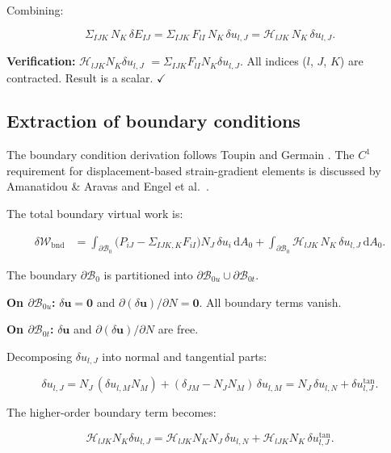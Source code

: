 \documentclass[11pt]{article}
\newcommand{\bu}{\mathbf{u}}
\newcommand{\bu}{\mathbf{u}}
\begin{document}
Combining:

\begin{equation}
\Sigma_{IJK}\,N_{K}\,\delta E_{IJ}
= \Sigma_{IJK}\,F_{lI}\,N_{K}\,\delta u_{l,J}
= \mathcal{H}_{lJK}\,N_{K}\,\delta u_{l,J}.
\end{equation}

\textbf{Verification:} $\mathcal{H}_{lJK}N_K\delta u_{l,J}$
$= \Sigma_{IJK}F_{lI}N_K\delta u_{l,J}$.
All indices ($l$, $J$, $K$) are contracted. Result is a scalar. $\checkmark$

\subsection{Extraction of boundary conditions}

The boundary condition derivation follows Toupin \cite{Toupin1964} and Germain \cite{Germain1973}. The $C^1$ requirement for displacement-based strain-gradient elements is discussed by Amanatidou \& Aravas \cite{AmanatidouAravas2002} and Engel et al.\ \cite{EngelGarikipati2002}.

The total boundary virtual work is:

\begin{align}
\delta\mathcal{W}_{\mathrm{bnd}}
&= \int_{\partial\mathcal{B}_{0}}
   \bigl(P_{iJ}-\Sigma_{IJK,K}F_{iI}\bigr)N_J\,\delta u_i\,
   \mathrm{d}A_0
 + \int_{\partial\mathcal{B}_{0}}
   \mathcal{H}_{lJK}\,N_K\,\delta u_{l,J}\,
   \mathrm{d}A_0.
\end{align}

The boundary $\partial\mathcal{B}_{0}$ is partitioned into
$\partial\mathcal{B}_{0u}\cup\partial\mathcal{B}_{0t}$.

\textbf{On $\partial\mathcal{B}_{0u}$:}
$\delta\bu=\mathbf{0}$ and $\partial(\delta\bu)/\partial N=\mathbf{0}$.
All boundary terms vanish.

\textbf{On $\partial\mathcal{B}_{0t}$:}
$\delta\bu$ and $\partial(\delta\bu)/\partial N$ are free.

Decomposing $\delta u_{l,J}$ into normal and tangential parts:

\begin{equation}
\delta u_{l,J} = N_J\,(\delta u_{l,M}N_M)
+ (\delta_{JM}-N_JN_M)\,\delta u_{l,M}
= N_J\,\delta u_{l,N} + \delta u_{l,J}^{\mathrm{tan}}.
\end{equation}

The higher-order boundary term becomes:

\begin{equation}
\mathcal{H}_{lJK}N_K\delta u_{l,J}
= \mathcal{H}_{lJK}N_KN_J\,\delta u_{l,N}
+ \mathcal{H}_{lJK}N_K\,\delta u_{l,J}^{\mathrm{tan}}.
\end{equation}
\end{document}

